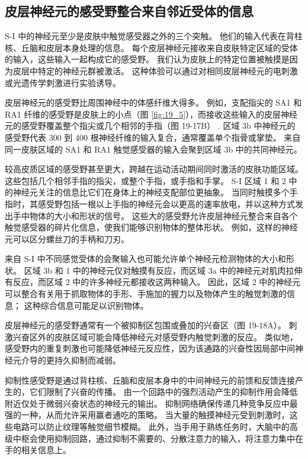 \subsection{皮层神经元的感受野整合来自邻近受体的信息}
S-I 中的神经元至少是皮肤中触觉感受器之外的三个突触。 他们的输入代表在背柱核、丘脑和皮层本身处理的信息。 每个皮层神经元接收来自皮肤特定区域的受体的输入，这些输入一起构成它的感受野。 我们认为皮肤上的特定位置被触摸是因为皮层中特定的神经元群被激活。 这种体验可以通过对相同皮层神经元的电刺激或光遗传学刺激进行实验诱导。

皮层神经元的感受野比周围神经中的体感纤维大得多。 例如，支配指尖的 SA1 和 RA1 纤维的感受野是皮肤上的小点（图 \ref{fig:19_5}），而接收这些输入的皮层神经元的感受野覆盖整个指尖或几个相邻的手指（图 19-17B） . 区域 3b 中神经元的感受野代表 300 到 400 根神经纤维的输入复合，通常覆盖单个指骨或掌垫。 来自同一皮肤区域的 SA1 和 RA1 触觉感受器的输入会聚到区域 3b 中的共同神经元。

较高皮质区域的感受野甚至更大，跨越在运动活动期间同时激活的皮肤功能区域。 这些包括几个相邻手指的指尖，或整个手指，或手指和手掌。 S-I 区域 1 和 2 中的神经元关注的信息比它们在身体上的神经支配部位更抽象。 当同时触摸多个手指时，其感受野包括一根以上手指的神经元会以更高的速率放电，并以这种方式发出手中物体的大小和形状的信号。 这些大的感受野允许皮层神经元整合来自各个触觉感受器的碎片化信息，使我们能够识别物体的整体形状。 例如，这样的神经元可以区分螺丝刀的手柄和刀刃。

来自 S-I 中不同感觉受体的会聚输入也可能允许单个神经元检测物体的大小和形状。 区域 3b 和 1 中的神经元仅对触摸有反应，而区域 3a 中的神经元对肌肉拉伸有反应，而区域 2 中的许多神经元都接收这两种输入。 因此，区域 2 中的神经元可以整合有关用于抓取物体的手形、手施加的握力以及物体产生的触觉刺激的信息； 这种综合信息可能足以识别物体。

皮层神经元的感受野通常有一个被抑制区包围或叠加的兴奋区（图 19-18A）。 刺激兴奋区外的皮肤区域可能会降低神经元对感受野内触觉刺激的反应。 类似地，感受野内的重复刺激也可能降低神经元反应性，因为该通路的兴奋性因局部中间神经元介导的更持久抑制而减弱。

抑制性感受野是通过背柱核、丘脑和皮层本身中的中间神经元的前馈和反馈连接产生的，它们限制了兴奋的传播。 由一个回路中的强烈活动产生的抑制作用会降低附近仅处于微弱兴奋状态的神经元的输出。 抑制网络确保传递几种竞争反应中最强的一种，从而允许采用赢者通吃的策略。 当大量的触摸神经元受到刺激时，这些电路可以防止纹理等触觉细节模糊。 此外，当手用于熟练任务时，大脑中的高级中枢会使用抑制回路，通过抑制不需要的、分散注意力的输入，将注意力集中在手的相关信息上。

